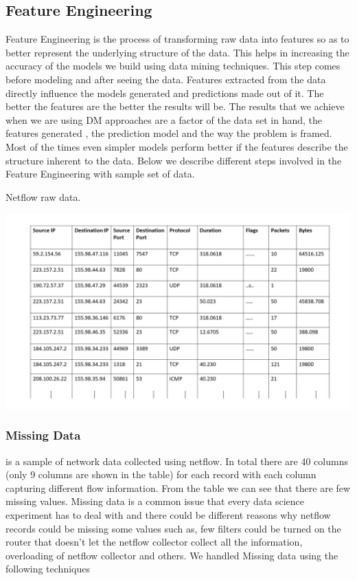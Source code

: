 \subsection{Feature Engineering}

Feature Engineering is the process of transforming raw
data into features so as to better represent the underlying structure of the data. This helps in increasing the accuracy of the models we build using data mining techniques. This step comes before modeling and after seeing the data.
Features extracted from the data directly influence the models generated and predictions made out of it. The better the features are the better the results will be. The results that we achieve when we are using DM approaches are a factor of the data set in hand, the features generated , the prediction model and the way the problem is framed. Most of the times even simpler models perform better if the features describe the structure inherent to the data. 
Below we describe different steps involved in the Feature Engineering with sample set of data.
\begin{table}[t]
	\caption{Netflow raw data.}%
	\centerline{\includegraphics[scale = 0.5]{raw_data.pdf}}	
\end{table}
 
\subsubsection{Missing Data} 

 is a sample of network data collected using netflow. In total there are 40 columns (only 9 columns are shown in the table) for each record with each column capturing different flow information. From the table we can see that there are few missing values. Missing data is a common issue that every data science experiment has to deal with and there could be different reasons why netflow records could be missing some values such as, few filters could be turned on the router that doesn't let the netflow collector collect all the information, overloading of netflow collector and others. We handled Missing data using the following techniques 

